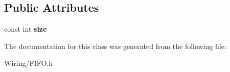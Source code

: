 \subsection*{Public Attributes}
\begin{DoxyCompactItemize}
\item 
\hypertarget{class_f_i_f_o_a538df52632ac71e5007802fe5a7435ae}{}const int {\bfseries size}\label{class_f_i_f_o_a538df52632ac71e5007802fe5a7435ae}

\end{DoxyCompactItemize}


The documentation for this class was generated from the following file\+:\begin{DoxyCompactItemize}
\item 
Wiring/F\+I\+F\+O.\+h\end{DoxyCompactItemize}
